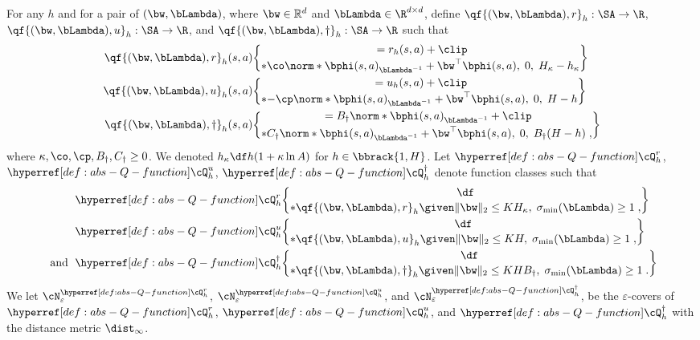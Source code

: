 \begin{definition}\label{def:abs-Q-function}
For any $h$ and for a pair of $(\bw, \bLambda)$, where $\bw \in \mathbb{R}^d$ and $\bLambda \in \R^{d\times d}$, define 
$\qf{(\bw, \bLambda), r}_{h} : \SA \to \R$, 
$\qf{(\bw, \bLambda), u}_{h}: \SA \to \R$,
and $\qf{(\bw, \bLambda), \dagger}_{h} : \SA \to \R$ such that
\begin{align*}
\qf{(\bw, \bLambda), r}_{h}(s, a) &=
r_h(s, a) + \clip\brace*{\co \norm*{\bphi(s, a)}_{\bLambda^{-1}} + \bw^{\top} \bphi(s, a),\; 0,\; H_\kappa-h_\kappa}\\
\qf{(\bw, \bLambda), u}_{h} (s, a) &= u_h(s, a) + \clip\brace*{-\cp \norm*{\bphi(s, a)}_{\bLambda^{-1}} + \bw^{\top} \bphi(s, a),\; 0,\; H-h}\\
\qf{(\bw, \bLambda), \dagger}_{h} (s, a) &= 
B_\dagger \norm*{\bphi(s, a)}_{\bLambda^{-1}} + \clip\brace*{C_\dagger \norm*{\bphi(s, a)}_{\bLambda^{-1}} + \bw^{\top} \bphi(s, a),\; 0,\; B_\dagger(H-h)}\;,
\end{align*}
where $\kappa, \co, \cp, B_\dagger, C_\dagger \geq 0$.
We denoted \(h_\kappa \df h(1 + \kappa \ln A)\) for $h \in \bbrack{1, H}$.
Let $\cQr_h$, $\cQu_h$, $\cQc_h$ denote function classes such that
\begin{align*}
\cQr_h&\df \brace*{\qf{(\bw, \bLambda), r}_{h}\given \|\bw\|_2 \leq KH_\kappa,\; \sigma_{\min }(\bLambda) \geq 1}\;,\\
\cQu_h&\df \brace*{\qf{(\bw, \bLambda), u}_h\given \|\bw\|_2 \leq KH,\; \sigma_{\min }(\bLambda) \geq 1}\;,\\
\text{ and }\; \cQc_h&\df \brace*{\qf{(\bw, \bLambda), \dagger}_h\given \|\bw\|_2 \leq KHB_\dagger ,\; \sigma_{\min }(\bLambda) \geq 1}\;.
\end{align*}
We let $\cN^{\cQr_h}_{\varepsilon}$, 
$\cN^{\cQu_h}_{\varepsilon}$, 
and $\cN^{\cQc_h}_{\varepsilon}$,
be the $\varepsilon$-covers of $\cQr_h$, $\cQu_h$, and $\cQc_h$ with the distance metric $\dist_\infty$.
\end{definition}


